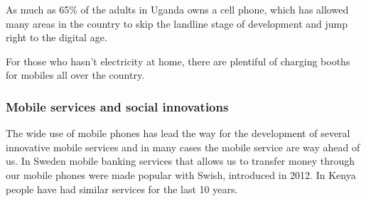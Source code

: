     As much as 65\% of the adults in Uganda owns a cell phone, which has allowed many areas in the country to skip the landline stage of development and jump right to the digital age.

    For those who hasn’t electricity at home, there are plentiful of charging booths for mobiles all over the country.

    \subsubsection{Mobile services and social innovations}
    The wide use of mobile phones has lead the way for the development of several innovative mobile services and in many cases the mobile service are way ahead of us. In Sweden mobile banking services that allows us to transfer money through our mobile phones were made popular with Swish, introduced in 2012. In Kenya people have had similar services for the last 10 years.
